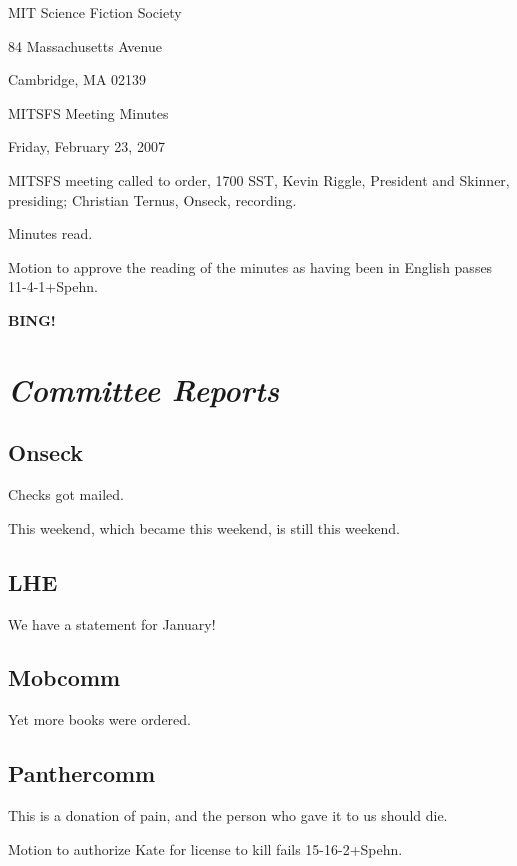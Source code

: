 \documentclass[10pt]{article}
\newcommand{\bing}{{\bf BING!} }
\newcommand{\goto}[1]{\bing \vskip 12pt \section*{{\em{#1}}}}
\begin{document}
\begin{center}

MIT Science Fiction Society

84 Massachusetts Avenue

Cambridge, MA 02139

\vspace{12pt}

MITSFS Meeting Minutes

Friday, February 23, 2007

\end{center}

\vspace{18pt}

\setlength{\parskip}{6pt}

\noindent
MITSFS meeting called to order, 1700 SST,
Kevin Riggle, President and Skinner, presiding; Christian Ternus, Onseck, recording.

Minutes read.

Motion to approve the reading of the minutes as having been in English passes 11-4-1+Spehn.

\goto{Committee Reports}

\subsection*{Onseck}

Checks got mailed.

This weekend, which became this weekend, is still this weekend.

\subsection*{LHE}

We have a statement for January!

\subsection*{Mobcomm}

Yet more books were ordered.

\subsection*{Panthercomm}

This is a donation of pain, and the person who gave it to us should die.

Motion to authorize Kate for license to kill fails 15-16-2+Spehn.
\end{document}
